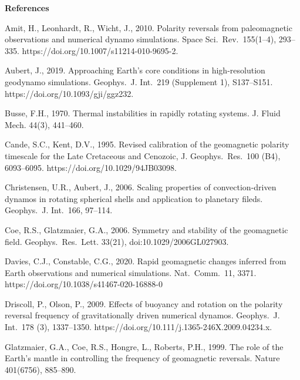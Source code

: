\bigskip
\noindent
{\bf References}
%
\begin{list}
{}{
\setlength{\parsep}{0pt}
\setlength{\itemsep}{0pt}
\setlength{\leftmargin}{1.0em}
\setlength{\itemindent}{-\leftmargin}
}
{\color{red}
\item 
\sloppy
Amit, H., Leonhardt, R., Wicht, J., 2010. Polarity reversals from paleomagnetic observations and numerical dynamo simulations. Space Sci.\ Rev.\ 155(1--4), 293--335. https://doi.org/10.1007/s11214-010-9695-2.
}
%
\item
\sloppy
Aubert, J., 2019. Approaching Earth's core conditions in high-resolution geodynamo simulations. Geophys.\ J. Int.\ 219 (Supplement 1), S137--S151. https://doi.org/10.1093/gji/ggz232.
%
\item
Busse, F.H., 1970. Thermal instabilities in rapidly rotating systems. J. Fluid Mech. 44(3), 441--460.
%
\item 
Cande, S.C., Kent, D.V., 1995. Revised calibration of the geomagnetic polarity timescale for the Late Cretaceous and Cenozoic, J. Geophys.\ Res.\ 100 (B4), 6093--6095. https://doi.org/10.1029/94JB03098.
%
\item
Christensen, U.R., Aubert, J., 2006. Scaling properties of convection-driven dynamos in rotating spherical shells and application to planetary fileds. Geophys.\ J. Int.\ 166, 97--114.
%
\item
Coe, R.S., Glatzmaier, G.A., 2006. Symmetry and stability of the geomagnetic field. Geophys.\ Res.\ Lett. 33(21), doi:10.1029/2006GL027903.
%
\item
{\color{red}
Davies, C.J., Constable, C.G., 2020. Rapid geomagnetic changes inferred from Earth observations and numerical simulations. Nat.\ Comm.\ 11, 3371. https://doi.org/10.1038/s41467-020-16888-0
}
%
\item
Driscoll, P., Olson, P., 2009. Effects of buoyancy and rotation on the polarity reversal frequency of gravitationally driven numerical dynamos. Geophys.\ J. Int.\ 178 (3), 1337--1350. https://doi.org/10.111/j.1365-246X.2009.04234.x.
%
\item
Glatzmaier, G.A., Coe, R.S., Hongre, L., Roberts, P.H., 1999. The role of the Earth's mantle in controlling the frequency of geomagnetic reversals. Nature 401(6756), 885--890.
%
\item

\end{list}
